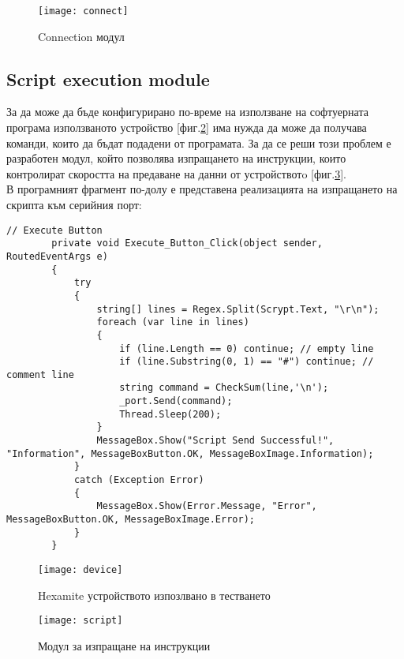 \begin{figure}
    \centerline{\texttt{[image: connect]}}
    \caption{Connection модул}
    \label{fig:connection}
\end{figure}

\subsection{Script execution module}
За да може да бъде конфигурирано по-време на използване на софтуерната програма използваното устройство [фиг.\ref{fig:device}] има нужда да може да получава команди, които да бъдат подадени от програмата. За да се реши този проблем е разработен модул, който позволява изпращането на инструкции, които контролират скоростта на предаване на данни от устройствотo [фиг.\ref{fig:script}].
\\
В програмният фрагмент по-долу е представена реализацията на изпращането на скрипта към серийния порт:
\begin{lstlisting}
// Execute Button
        private void Execute_Button_Click(object sender, RoutedEventArgs e)
        {
            try
            {
                string[] lines = Regex.Split(Scrypt.Text, "\r\n");
                foreach (var line in lines)
                {                    
                    if (line.Length == 0) continue; // empty line                    
                    if (line.Substring(0, 1) == "#") continue; // comment line
                    string command = CheckSum(line,'\n');
                    _port.Send(command); 
                    Thread.Sleep(200); 
                }
                MessageBox.Show("Script Send Successful!", "Information", MessageBoxButton.OK, MessageBoxImage.Information);
            }
            catch (Exception Error)
            {
                MessageBox.Show(Error.Message, "Error", MessageBoxButton.OK, MessageBoxImage.Error);
            }
        }
\end{lstlisting}




\begin{figure}
    \centerline{\texttt{[image: device]}}
    \caption{Hexamite устройството изпозлвано в тестването}
    \label{fig:device}
\end{figure}

\begin{figure}
    \centerline{\texttt{[image: script]}}
    \caption{Модул за изпращане на инструкции}
    \label{fig:script}
\end{figure}

